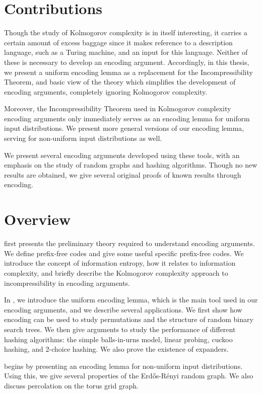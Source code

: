 \section{Contributions}

Though the study of Kolmogorov complexity is in itself interesting, it
carries a certain amount of excess baggage since it makes reference to
a description language, such as a Turing machine, and an input for
this language. Neither of these is necessary to develop an encoding
argument. Accordingly, in this thesis, we present a uniform encoding
lemma as a replacement for the Incompressibility Theorem, and basic
view of the theory which simplifies the development of encoding
arguments, completely ignoring Kolmogorov complexity.

Moreover, the Incompressibility Theorem used in Kolmogorov complexity
encoding arguments only immediately serves as an encoding lemma for
uniform input distributions. We present more general versions of our
encoding lemma, serving for non-uniform input distributions as well.

We present several encoding arguments developed using these tools,
with an emphasis on the study of random graphs and hashing
algorithms. Though no new results are obtained, we give several
original proofs of known results through encoding.

\section{Overview}

 first presents the preliminary theory required to
understand encoding arguments. We define prefix-free codes and give
some useful specific prefix-free codes. We introduce the concept of
information entropy, how it relates to information complexity, and
briefly describe the Kolmogorov complexity approach to
incompressibility in encoding arguments.

In , we introduce the uniform encoding lemma, which is the
main tool used in our encoding arguments, and we describe several
applications. We first show how encoding can be used to study
permutations and the structure of random binary search trees. We then
give arguments to study the performance of different hashing
algorithms: the simple balls-in-urns model, linear probing, cuckoo
hashing, and 2-choice hashing. We also prove the existence of
expanders.

 begins by presenting an encoding lemma for non-uniform
input distributions. Using this, we give several properties of the
Erd\H{o}s-R\'{e}nyi random graph. We also discuss percolation on the
torus grid graph.

